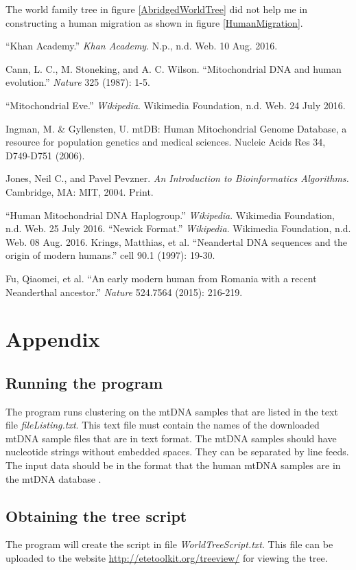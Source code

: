 \documentclass[conference]{IEEEtran}
\begin{document}
The world family tree in figure \ref{AbridgedWorldTree} did not help me in constructing a human migration as shown in figure \ref{HumanMigration}. 


\FloatBarrier
\begin{thebibliography}{1}

\enquote{Khan Academy.} \textit{Khan Academy}. N.p., n.d. Web. 10 Aug. 2016.

Cann, L. C., M. Stoneking, and A. C. Wilson. \enquote{Mitochondrial DNA and human evolution.} \textit{Nature} 325 (1987): 1-5.

\enquote{Mitochondrial Eve.} \textit{Wikipedia}. Wikimedia Foundation, n.d. Web. 24 July 2016.

Ingman, M. \& Gyllensten, U. mtDB: Human Mitochondrial Genome Database, a resource for population genetics and medical sciences. Nucleic Acids Res 34, D749-D751 (2006).

Jones, Neil C., and Pavel Pevzner. \textit{An Introduction to Bioinformatics Algorithms.} Cambridge, MA: MIT, 2004. Print.

\enquote{Human Mitochondrial DNA Haplogroup.} \textit{Wikipedia}. Wikimedia Foundation, n.d. Web. 25 July 2016.
\enquote{Newick Format.} \textit{Wikipedia}. Wikimedia Foundation, n.d. Web. 08 Aug. 2016.
Krings, Matthias, et al. \enquote{Neandertal DNA sequences and the origin of modern humans.} cell 90.1 (1997): 19-30.

Fu, Qiaomei, et al. \enquote{An early modern human from Romania with a recent Neanderthal ancestor.} \textit{Nature} 524.7564 (2015): 216-219.
\end{thebibliography}

\section{Appendix}
\subsection{Running the program}
\label{sssec:num1} 

The program runs clustering on the mtDNA samples that are listed in the text file \textit{fileListing.txt}. This text file must contain the names of the downloaded mtDNA sample files that are in text format. The mtDNA samples should have nucleotide strings without embedded spaces. They can be separated by line feeds. The input data should be in the format that the human mtDNA samples are in the mtDNA database \cite{mtDnaDatabase}.

\subsection{Obtaining the tree script}
The program will create the script in file \textit{WorldTreeScript.txt}. This file can be uploaded to the website \url{http://etetoolkit.org/treeview/} for viewing the tree.
\end{document}
